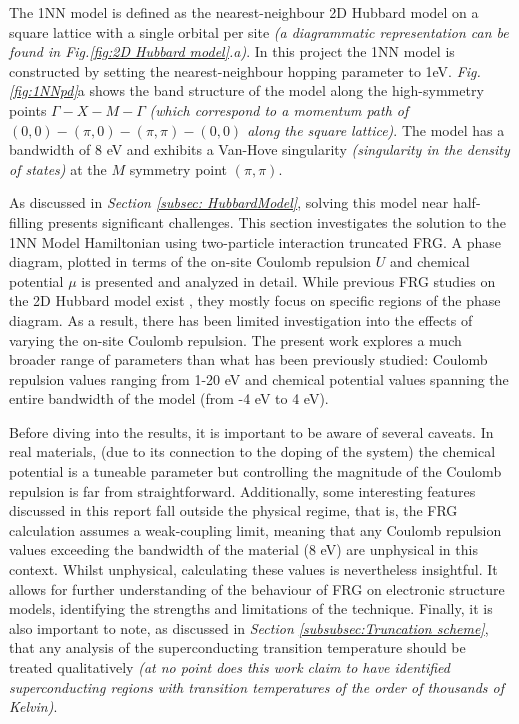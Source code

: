 \documentclass[11pt]{article}
\begin{document}
\noindent The 1NN model is defined as the nearest-neighbour 2D Hubbard model on a square lattice with a single orbital per site \textit{(a diagrammatic representation can be found in Fig.\ref{fig:2D Hubbard model}.a)}. 
In this project the 1NN model is constructed by setting the nearest-neighbour hopping parameter to 1eV.
\textit{Fig.\ref{fig:1NNpd}}a shows the band structure of the model along the high-symmetry points $\Gamma-X-M-\Gamma$ \textit{ (which correspond to a momentum path of $(0,0)-(\pi,0)-(\pi,\pi)-(0,0)$ along the square lattice)}.
The model has a bandwidth of 8 eV and exhibits a Van-Hove singularity \textit{(singularity in the density of states)} at the $M$ symmetry point \textit{$(\pi,\pi)$}. \par
\medskip


\noindent As discussed in \textit{Section \ref{subsec: HubbardModel}}, solving this model near half-filling presents significant challenges. 
This section investigates the solution to the 1NN Model Hamiltonian using two-particle interaction truncated FRG.
A phase diagram, plotted in terms of the on-site Coulomb repulsion 
$U$ and chemical potential $\mu$ is presented and analyzed in detail. While previous FRG studies on the 2D Hubbard model exist \cite{beyer2023rashba,hille2020quantitative,vilardi2020dynamical},
they mostly focus on specific regions of the phase diagram. As a result, there has been limited investigation into the effects of varying the on-site Coulomb repulsion.
The present work explores a much broader range of parameters than what has been previously studied: Coulomb repulsion values ranging from 1-20 eV 
and chemical potential values spanning the entire bandwidth of the model (from -4 eV to 4 eV). \par

\medskip


\noindent Before diving into the results, it is important to be aware of several caveats. 
In real materials, (due to its connection to the doping of the system) the chemical potential is a tuneable parameter 
but controlling the magnitude of the Coulomb repulsion is far from straightforward. 
Additionally, some interesting features discussed in this report fall outside the physical regime, that is, the FRG calculation assumes a weak-coupling limit, meaning that any Coulomb 
repulsion values exceeding the bandwidth of the material (8 eV) are unphysical in this context.
Whilst unphysical, calculating these values is nevertheless insightful. It allows for further
understanding of the behaviour of FRG on electronic structure models, identifying the 
strengths and limitations of the technique.  
Finally, it is also important to note, as discussed in \textit{Section \ref{subsubsec:Truncation scheme}}, that any analysis of the 
superconducting transition temperature should be treated qualitatively \textit{(at no point does this work claim to have identified superconducting 
regions with transition temperatures of the order of thousands of Kelvin)}.
\end{document}
